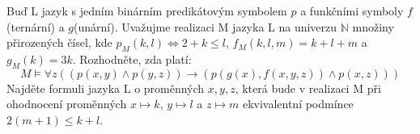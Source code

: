 \subsubsection{}
Buď L jazyk s jedním binárním predikátovým symbolem $p$ a funkčními symboly
$f$(ternární) a $g$(unární). Uvažujme realizaci M jazyka L na univerzu
$\mathbb{N}$ množiny přirozených čísel, kde $p_{M}(k,l) \Leftrightarrow 2+k
\leq l$, $f_{M}(k,l,m)=k+l+m$ a $g_{M}(k)=3k$. Rozhodněte, zda platí:
$$M \models \forall z ((p(x,y) \wedge p(y,z)) \rightarrow (p(g(x),f(x,y,z))
\wedge p(x,z)))$$
Najděte formuli jazyka L o proměnných $x,y,z$, která bude v realizaci M při
ohodnocení proměnných $x \mapsto k$, $y \mapsto l$ a $z \mapsto m$ ekvivalentní
podmínce $2(m+1)\leq k+l$.
